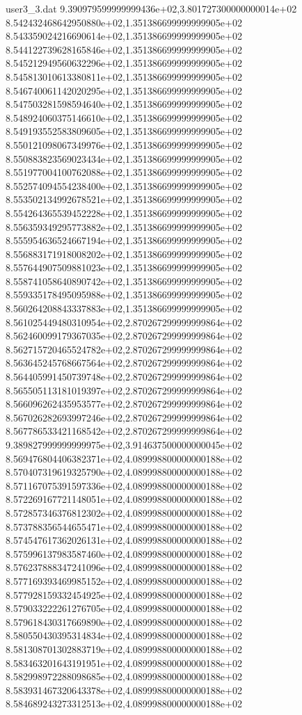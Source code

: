 \begin{filecontents}{user3_3.dat}
9.390979599999999436e+02,3.801727300000000014e+02
8.542432468642950880e+02,1.351386699999999905e+02
8.543359024216690614e+02,1.351386699999999905e+02
8.544122739628165846e+02,1.351386699999999905e+02
8.545212949560632296e+02,1.351386699999999905e+02
8.545813010613380811e+02,1.351386699999999905e+02
8.546740061142020295e+02,1.351386699999999905e+02
8.547503281598594640e+02,1.351386699999999905e+02
8.548924060375146610e+02,1.351386699999999905e+02
8.549193552583809605e+02,1.351386699999999905e+02
8.550121098067349976e+02,1.351386699999999905e+02
8.550883823569023434e+02,1.351386699999999905e+02
8.551977004100762088e+02,1.351386699999999905e+02
8.552574094554238400e+02,1.351386699999999905e+02
8.553502134992678521e+02,1.351386699999999905e+02
8.554264365539452228e+02,1.351386699999999905e+02
8.556359349295773882e+02,1.351386699999999905e+02
8.555954636524667194e+02,1.351386699999999905e+02
8.556883171918008202e+02,1.351386699999999905e+02
8.557644907509881023e+02,1.351386699999999905e+02
8.558741058640890742e+02,1.351386699999999905e+02
8.559335178495095988e+02,1.351386699999999905e+02
8.560264208843337883e+02,1.351386699999999905e+02
8.561025449480310954e+02,2.870267299999999864e+02
8.562460099179367035e+02,2.870267299999999864e+02
8.562715720465524782e+02,2.870267299999999864e+02
8.563645245768667564e+02,2.870267299999999864e+02
8.564405991450739748e+02,2.870267299999999864e+02
8.565505113181019397e+02,2.870267299999999864e+02
8.566096262435953577e+02,2.870267299999999864e+02
8.567026282693997246e+02,2.870267299999999864e+02
8.567786533421168542e+02,2.870267299999999864e+02
9.389827999999999975e+02,3.914637500000000045e+02
8.569476804406382371e+02,4.089998800000000188e+02
8.570407319619325790e+02,4.089998800000000188e+02
8.571167075391597336e+02,4.089998800000000188e+02
8.572269167721148051e+02,4.089998800000000188e+02
8.572857346376812302e+02,4.089998800000000188e+02
8.573788356544655471e+02,4.089998800000000188e+02
8.574547617362026131e+02,4.089998800000000188e+02
8.575996137983587460e+02,4.089998800000000188e+02
8.576237888347241096e+02,4.089998800000000188e+02
8.577169393469985152e+02,4.089998800000000188e+02
8.577928159332454925e+02,4.089998800000000188e+02
8.579033222261276705e+02,4.089998800000000188e+02
8.579618430317669890e+02,4.089998800000000188e+02
8.580550430395314834e+02,4.089998800000000188e+02
8.581308701302883719e+02,4.089998800000000188e+02
8.583463201643191951e+02,4.089998800000000188e+02
8.582998972288098685e+02,4.089998800000000188e+02
8.583931467320643378e+02,4.089998800000000188e+02
8.584689243273312513e+02,4.089998800000000188e+02

\end{filecontents}
